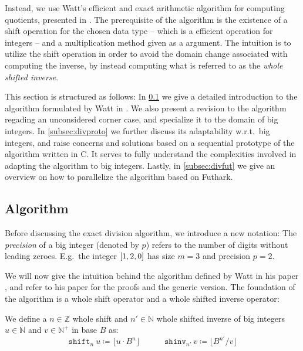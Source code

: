 Instead, we use Watt's efficient and exact arithmetic algorithm for computing
quotients, presented in \cite{watt2023efficient}. The prerequisite of the
algorithm is the existence of a shift operation for the chosen data type -- which
is a efficient operation for integers -- and a multiplication method given as a
argument. The intuition is to utilize the shift operation in order to avoid the
domain change associated with computing the inverse, by instead computing what
is referred to as the \textit{whole shifted inverse}.

This section is structured as follows: In \ref{subsec:divalg} we give a detailed
introduction to the algorithm formulated by Watt in \cite{watt2023efficient}. We
also present a revision to the algorithm regading an unconsidered corner case,
and specialize it to the domain of big integers. In \ref{subsec:divproto} we
further discuss its adaptability w.r.t.\ big integers, and raise concerns and
solutions based on a sequential prototype of the algorithm written in C. It
serves to fully understand the complexities involved in adapting the algorithm
to big integers. Lastly, in \ref{subsec:divfut} we give an overview on how to
parallelize the algorithm based on Futhark.

\subsection{Algorithm}
\label{subsec:divalg}

Before discussing the exact division algorithm, we introduce a new notation: The
\textit{precision} of a big integer (denoted by $p$) refers to the number of
digits without leading zeroes. E.g.\ the integer $\mathtt{[}1,2,0\mathtt{]}$ has size $m=3$
and precision $p=2$.

We will now give the intuition behind the algorithm defined by Watt in his paper
\cite{watt2023efficient}, and refer to his paper for the proofs and the generic
version. The foundation of the algorithm is a whole shift operator and a whole
shifted inverse operator:

\begin{definition}
  We define a $n \in \mathbb{Z}$ whole shift and $n' \in \mathbb{N}$ whole shifted inverse of big
  integers $u\in \mathbb{N}$ and $v\in \mathbb{N}^{+}$ in base $B$ as:
  \begin{equation}\label{eq:shifts}
    \mathtt{shift}_n~u \coloneq \lfloor u \cdot B^n \rfloor \quad \qquad \mathtt{shinv}_{n'}~v \coloneq \lfloor B^{n'}/ v \rfloor
    \end{equation}
\end{definition}

